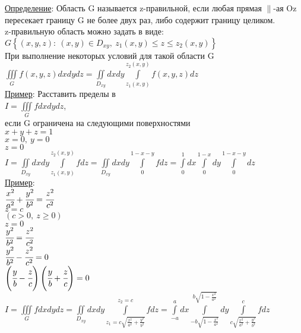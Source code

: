 
\underline{Определение}: Область G называется z-правильной, если любая прямая $\parallel$-ая Oz пересекает границу G не более двух раз, либо содержит границу целиком. \\

z-правильную область можно задать в виде: \\
$G \left\{ (x,y,z): \ (x,y) \in D_{xy}, \ z_1(x,y) \leqslant z \leqslant z_2(x,y) \right\}$ \\
При выполнение некоторых условий для такой области G \\
$\displaystyle  \iiint\limits_{G} f(x,y,z) dxdydz = \iint\limits_{D_{xy}} dxdy \int\limits_{z_1(x,y)}^{z_2(x,y)} f(x,y,z) dz$ \\


\underline{Пример}: Расставить пределы в \\
$\displaystyle  I = \iiint\limits_{G} f dxdydz$, \\
если G ограничена на следующими поверхностями \\
$x + y + z = 1$ \\
$x = 0, \ y = 0$ \\
$z = 0$ \\
$\displaystyle   I = \iint\limits_{D_{xy}} dxdy \int\limits_{z_1(x,y)}^{z_2(x,y)} f dz = 
\iint\limits_{D_{xy}} dxdy \int\limits_{0}^{1 - x -y} fdz = 
\int\limits_{0}^{1} dx \int\limits_{0}^{1 - x} dy \int\limits_{0}^{1 - x -y} dz$ \\


\underline{Пример}: \\
$\cfrac{x^2}{a^2} + \cfrac{y^2}{b^2} = \cfrac{z^2}{c^2}$ \\
$z = c$ \\
$(c > 0, \ z \geqslant 0)$ \\
$z = 0$ \\
$\cfrac{y^2}{b^2} = \cfrac{z^2}{c^2}$ \\
$\cfrac{y^2}{b^2} - \cfrac{z^2}{c^2} = 0$ \\
$\left( \cfrac{y}{b} - \cfrac{z}{c} \right) \left( \cfrac{y}{b} + \cfrac{z}{c} \right) = 0$ \\
$\displaystyle   I = \iiint\limits_{G} f dxdydz = 
\iint\limits_{D_{xy}} dxdy \int\limits_{z_1 = c \sqrt{\tfrac{x^2}{a^2} + \tfrac{y^2}{b^2}}}^{z_2 = c} f dz = 
\int\limits_{-a}^{a} dx \int\limits_{-b \sqrt{1 - \tfrac{x^2}{a^2}}}^{b \sqrt{1 - \tfrac{x^2}{a^2}}} dy \int\limits_{c \sqrt{\tfrac{x^2}{a^2} + \tfrac{y^2}{b^2}}}^{c} f dz $ \\


